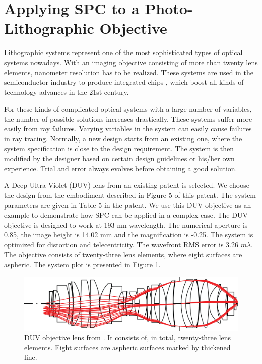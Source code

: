 \newpage
\section{Applying SPC to a Photo-Lithographic Objective}
Lithographic systems represent one of the most sophisticated types of optical systems nowadays. With an imaging objective consisting of more than twenty lens elements, nanometer resolution has to be realized. These systems are used in the semiconductor industry to produce integrated chips \cite{Matsuyama2006_LithoHis}, which boost all kinds of technology advances in the 21st century. 

For these kinds of complicated optical systems with a large number of variables, the number of possible solutions increases drastically. These systems suffer more easily from ray failures. Varying variables in the system can easily cause failures in ray tracing. Normally, a new design starts from an existing one, where the system specification is close to the design requirement. The system is then modified by the designer based on certain design guidelines \cite{LivshitsQA2013}\cite{Shafer1995_moreless}\cite{Cao2017_GroupDesign} or his/her own experience. Trial and error always evolves before obtaining a good solution. 

A Deep Ultra Violet (DUV) lens from an existing patent \cite{patentZeissDUV} is selected. We choose the design from the embodiment described in Figure 5 of this patent. The system parameters are given in Table 5 in the patent. We use this DUV objective as an example to demonstrate how SPC can be applied in a complex case. The DUV objective is designed to work at 193 nm wavelength. The numerical aperture is 0.85, the image height is 14.02 mm and the magnification is -0.25. The system is optimized for distortion and telecentricity. The wavefront RMS error is 3.26 $m\lambda$. The objective consists of twenty-three lens elements, where eight surfaces are aspheric. The system plot is presented in Figure \ref{fig: litho_DUV_plot}. 
\begin{figure}[h!]
    \centering
    \includegraphics[width=\textwidth]{chapter-4/figures/Litho_DUV_plot.png}
    \caption{DUV objective lens from \cite{patentZeissDUV}. It consists of, in total, twenty-three lens elements. Eight surfaces are aspheric surfaces marked by thickened line.}
    \label{fig: litho_DUV_plot}
\end{figure}

